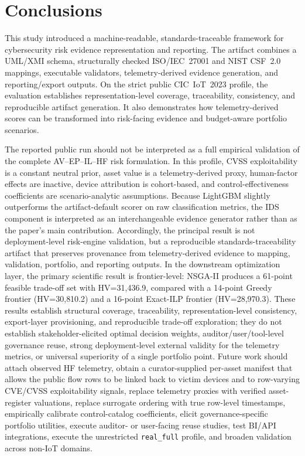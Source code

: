 \documentclass[preprint,12pt]{elsarticle}
\begin{document}
\section{Conclusions}
\label{sec:conclusions}
This study introduced a machine-readable, standards-traceable framework for cybersecurity risk evidence representation and reporting. The artifact combines a UML/XMI schema, structurally checked ISO/IEC~27001 and NIST CSF~2.0 mappings, executable validators, telemetry-derived evidence generation, and reporting/export outputs. On the strict public CIC~IoT~2023 profile, the evaluation establishes representation-level coverage, traceability, consistency, and reproducible artifact generation. It also demonstrates how telemetry-derived scores can be transformed into risk-facing evidence and budget-aware portfolio scenarios.

The reported public run should not be interpreted as a full empirical validation of the complete AV--EP--IL--HF risk formulation. In this profile, CVSS exploitability is a constant neutral prior, asset value is a telemetry-derived proxy, human-factor effects are inactive, device attribution is cohort-based, and control-effectiveness coefficients are scenario-analytic assumptions. Because LightGBM slightly outperforms the artifact-default scorer on raw classification metrics, the IDS component is interpreted as an interchangeable evidence generator rather than as the paper's main contribution. Accordingly, the principal result is not deployment-level risk-engine validation, but a reproducible standards-traceability artifact that preserves provenance from telemetry-derived evidence to mapping, validation, portfolio, and reporting outputs. In the downstream optimization layer, the primary scientific result is frontier-level: NSGA-II produces a 61-point feasible trade-off set with HV=31{,}436.9, compared with a 14-point Greedy frontier (HV=30{,}810.2) and a 16-point Exact-ILP frontier (HV=28{,}970.3). These results establish structural coverage, traceability, representation-level consistency, export-layer provisioning, and reproducible trade-off exploration; they do not establish stakeholder-elicited optimal decision weights, auditor/user/tool-level governance reuse, strong deployment-level external validity for the telemetry metrics, or universal superiority of a single portfolio point. Future work should attach observed HF telemetry, obtain a curator-supplied per-asset manifest that allows the public flow rows to be linked back to victim devices and to row-varying CVE/CVSS exploitability signals, replace telemetry proxies with verified asset-register valuations, replace surrogate ordering with true row-level timestamps, empirically calibrate control-catalog coefficients, elicit governance-specific portfolio utilities, execute auditor- or user-facing reuse studies, test BI/API integrations, execute the unrestricted \texttt{real\_full} profile, and broaden validation across non-IoT domains.
\end{document}
